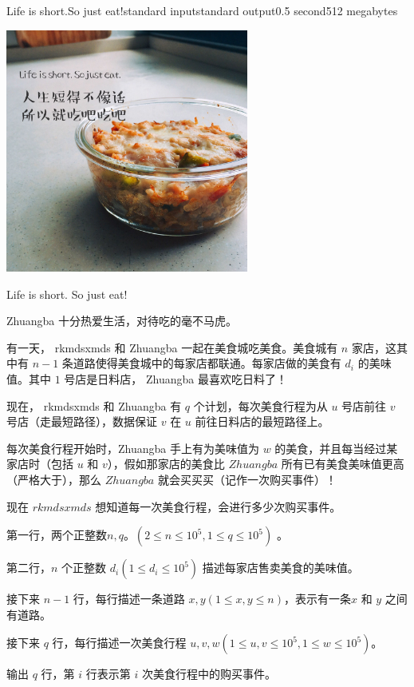 \begin{problem}{Life is short.So just eat!}{standard input}{standard output}{0.5 second}{512 megabytes}

\includegraphics[width=0.60\textwidth]{ak.jpg}%

Life is short. So just eat!

Zhuangba 十分热爱生活，对待吃的毫不马虎。

有一天， rkmdsxmds 和 Zhuangba 一起在美食城吃美食。美食城有 $n$ 家店，这其中有 $n-1$ 条道路使得美食城中的每家店都联通。每家店做的美食有 $d_i$ 的美味值。其中 $1$ 号店是日料店， Zhuangba 最喜欢吃日料了！

现在， rkmdsxmds 和 Zhuangba 有 $q$ 个计划，每次美食行程为从 $u$ 号店前往 $v$ 号店（走最短路径），数据保证 $v$ 在 $u$ 前往日料店的最短路径上。

每次美食行程开始时，Zhuangba 手上有为美味值为 $w$ 的美食，并且每当经过某家店时（包括 $u$ 和 $v$），假如那家店的美食比 $Zhuangba$ 所有已有美食美味值更高（严格大于），那么 $Zhuangba$ 就会买买买（记作一次购买事件）！

现在 $rkmdsxmds$ 想知道每一次美食行程，会进行多少次购买事件。

\InputFile
第一行，两个正整数$n , q。(2\le n \le 10^{5}, 1\le q \le 10^{5})$ 。

第二行，$n$ 个正整数 $d_i(1\le d_i \le 10^5)$ 描述每家店售卖美食的美味值。

接下来 $n-1$ 行，每行描述一条道路 $x, y(1\le x, y \le n)$，表示有一条$x$ 和 $y$ 之间有道路。

接下来 $q$ 行，每行描述一次美食行程 $u , v , w(1\le u,v \le 10^5, 1 \le w \le 10^5)$。

\OutputFile

输出 $q$ 行，第 $i$ 行表示第 $i$ 次美食行程中的购买事件。 

\Example

\begin{example}
%
\end{example}

\end{problem}

